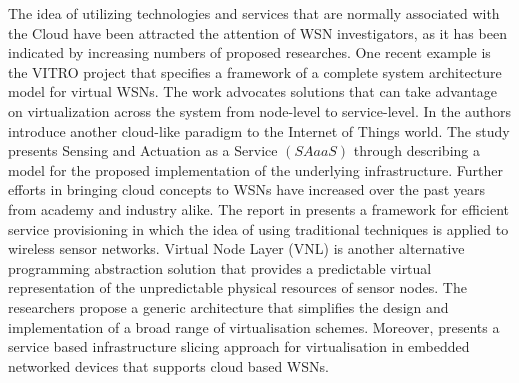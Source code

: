 The idea of utilizing technologies and services that are normally associated with the Cloud have been attracted the attention of WSN investigators, as it has been indicated by increasing numbers of proposed researches. One recent example is the VITRO project \cite{6076694} that specifies a framework of a complete system architecture model for virtual WSNs. The work advocates solutions that can take advantage on virtualization across the system from node-level to service-level.
In \cite{SAaaS} the authors introduce another cloud-like paradigm to the Internet of Things world. The study presents Sensing and Actuation as a Service $\left(SAaaS\right)$ through describing a model for the proposed implementation of the underlying infrastructure. Further efforts in bringing cloud concepts to WSNs have increased over the past years from academy and industry alike. The report in \cite{sarakis2012framework} presents a framework for efficient service provisioning in which the idea of using traditional techniques is applied to wireless sensor networks. Virtual Node Layer (VNL) \cite{Brown:2007:VNL:1317103.1317105} is another alternative programming abstraction solution that provides a predictable virtual representation of the unpredictable physical resources of sensor nodes. The researchers propose a generic architecture that simplifies the design and implementation of a broad range of virtualisation schemes. Moreover, \cite{6529470} presents a service based infrastructure slicing approach for virtualisation in embedded networked devices that supports cloud based WSNs.